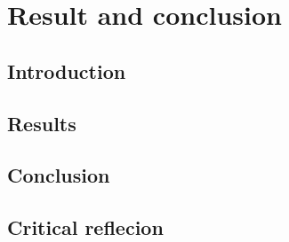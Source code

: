 \chapter{Result and conclusion}

\section{Introduction}
\section{Results}
\section{Conclusion}
\section{Critical reflecion}